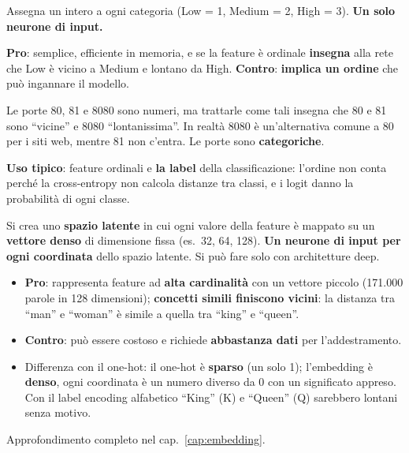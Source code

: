 \begin{definizione}
Assegna un intero a ogni categoria (Low = 1, Medium = 2, High = 3). \textbf{Un solo neurone di input.}
\end{definizione}
\textbf{Pro}: semplice, efficiente in memoria, e se la feature è ordinale \textbf{insegna} alla rete che Low è vicino a
Medium e lontano da High. \textbf{Contro}: \textbf{implica un ordine} che può ingannare il modello.
\begin{esempio}
Le porte 80, 81 e 8080 sono numeri, ma trattarle come tali insegna che 80 e 81 sono ``vicine'' e 8080 ``lontanissima''. In realtà
8080 è un'alternativa comune a 80 per i siti web, mentre 81 non c'entra. Le porte sono \textbf{categoriche}.
\end{esempio}
\textbf{Uso tipico}: feature ordinali e \textbf{la label} della classificazione: l'ordine non conta perché la
cross-entropy non calcola distanze tra classi, e i logit danno la probabilità di ogni classe.

\begin{definizione}[embedding]
Si crea uno \textbf{spazio latente} in cui ogni valore della feature è mappato su un \textbf{vettore denso} di dimensione
fissa (es.\ 32, 64, 128). \textbf{Un neurone di input per ogni coordinata} dello spazio latente. Si può fare solo con
architetture deep.
\end{definizione}
\begin{itemize}
  \item \textbf{Pro}: rappresenta feature ad \textbf{alta cardinalità} con un vettore piccolo (171.000 parole in 128 dimensioni);
        \textbf{concetti simili finiscono vicini}: la distanza tra ``man'' e ``woman'' è simile a quella tra ``king'' e ``queen''.
  \item \textbf{Contro}: può essere costoso e richiede \textbf{abbastanza dati} per l'addestramento.
  \item Differenza con il one-hot: il one-hot è \textbf{sparso} (un solo 1); l'embedding è \textbf{denso}, ogni coordinata è
        un numero diverso da 0 con un significato appreso. Con il label encoding alfabetico ``King'' (K) e ``Queen'' (Q)
        sarebbero lontani senza motivo.
\end{itemize}
Approfondimento completo nel cap.~\ref{cap:embedding}.

